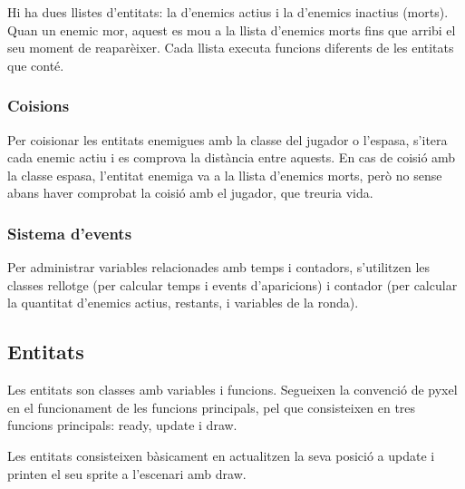 Hi ha dues llistes d'entitats:
la d'enemics actius i la d'enemics inactius (morts).
Quan un enemic mor, aquest es mou a la llista d'enemics morts
fins que arribi el seu moment de reapar\`eixer.
Cada llista executa funcions diferents de les entitats que cont\'e.

\subsubsection{Co\lgem isions}
Per co\lgem isionar les entitats enemigues amb la classe del jugador o l'espasa,
s'itera cada enemic actiu i es comprova la dist\`ancia entre aquests.
En cas de co\lgem isi\'o amb la classe espasa,
l'entitat enemiga va a la llista d'enemics morts,
per\`o no sense abans haver comprobat la co\lgem isi\'o amb el jugador,
que treuria vida.

\subsubsection{Sistema d'events}
Per administrar variables relacionades amb temps i contadors,
s'utilitzen les classes rellotge
(per calcular temps i events d'aparicions)
i contador
(per calcular la quantitat d'enemics actius, restants, i variables de la ronda).


\subsection{Entitats}
Les entitats son classes amb variables i funcions.
Segueixen la convenci\'o de pyxel en el funcionament de les funcions principals,
pel que consisteixen en tres funcions principals:
ready, update i draw.

Les entitats consisteixen b\`asicament en actualitzen la seva posici\'o a update
i printen el seu sprite a l'escenari amb draw.
